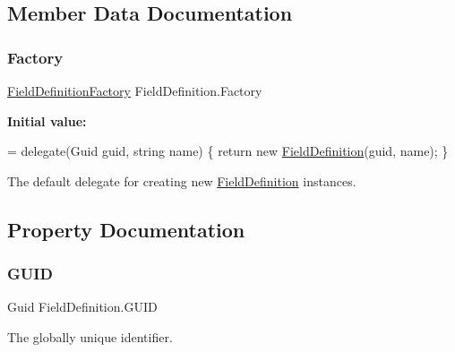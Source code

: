 \subsection{Member Data Documentation}
\mbox{\label{class_field_definition_a5913096820f688bc8e6642cc8714457d}} 
\subsubsection{\texorpdfstring{Factory}{Factory}}
{\footnotesize\ttfamily \hyperlink{class_field_definition_af50dfa2594c8b9ac6fcc592356c0117a}{Field\+Definition\+Factory} Field\+Definition.\+Factory\hspace{0.3cm}{\ttfamily [static]}}

{\bfseries Initial value\+:}
\begin{DoxyCode}
= delegate(Guid guid, \textcolor{keywordtype}{string} name)
    \{
        \textcolor{keywordflow}{return} \textcolor{keyword}{new} \hyperlink{class_field_definition_a280ce8e3246dee627de3e0c1561f897d}{FieldDefinition}(guid, name);
    \}
\end{DoxyCode}


The default delegate for creating new \hyperlink{class_field_definition}{Field\+Definition} instances. 



\subsection{Property Documentation}
\mbox{\label{class_field_definition_aedeba7c34e3c6bc5a6a34cfd335aa75e}} 
\subsubsection{\texorpdfstring{G\+U\+ID}{GUID}}
{\footnotesize\ttfamily Guid Field\+Definition.\+G\+U\+ID\hspace{0.3cm}{\ttfamily [get]}}



The globally unique identifier. 

\mbox{\label{class_field_definition_aa65595b10037eab102872bcca4934ea3}} 
